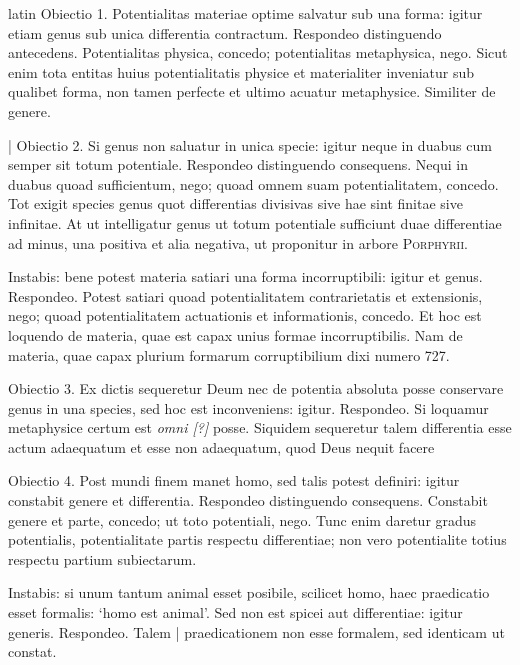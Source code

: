 \begin{otherlanguage*}{latin}
\pstart
 Obiectio 1. Potentialitas materiae optime salvatur sub una forma: igitur etiam genus sub unica differentia contractum. Respondeo distinguendo antecedens. Potentialitas physica, concedo; potentialitas metaphysica, nego. Sicut enim tota entitas huius potentialitatis physice et materialiter inveniatur sub qualibet forma, non tamen perfecte et ultimo acuatur metaphysice. Similiter de genere. 
\pend

\pstart
 \textnormal{|} Obiectio 2. Si genus non saluatur in unica specie: igitur neque in duabus cum semper sit totum potentiale. Respondeo distinguendo consequens. Nequi in duabus quoad sufficientum, nego; quoad omnem suam potentialitatem, concedo. Tot exigit species genus quot differentias divisivas sive hae sint finitae sive infinitae. At ut intelligatur genus ut totum potentiale sufficiunt duae differentiae ad minus, una positiva et alia negativa, ut proponitur in arbore \textsc{Porphyrii}. 
\pend

\pstart
 Instabis: bene potest materia satiari una forma incorruptibili: igitur et genus. Respondeo. Potest satiari quoad potentialitatem contrarietatis et extensionis, nego; quoad potentialitatem actuationis et informationis, concedo. Et hoc est loquendo de materia, quae est capax unius formae incorruptibilis. Nam de materia, quae capax plurium formarum corruptibilium dixi numero 727. 
\pend

\pstart
 Obiectio 3. Ex dictis sequeretur Deum nec de potentia absoluta posse conservare genus in una species, sed hoc est inconveniens: igitur. Respondeo. Si loquamur metaphysice certum est \emph{omni [?]} posse. Siquidem sequeretur talem differentia esse actum adaequatum et esse non adaequatum, quod Deus nequit facere 
\pend

\pstart
 Obiectio 4. Post mundi finem manet homo, sed talis potest definiri: igitur constabit genere et differentia. Respondeo distinguendo consequens. Constabit genere et parte, concedo; ut toto potentiali, nego. Tunc enim daretur gradus potentialis, potentialitate partis respectu differentiae; non vero potentialite totius respectu partium subiectarum. 
\pend

\pstart
 Instabis: si unum tantum animal esset posibile, scilicet homo, haec praedicatio esset formalis: `homo est animal'. Sed non est spicei aut differentiae: igitur generis. Respondeo. Talem \textnormal{|}   praedicationem non esse formalem, sed identicam ut constat. 
\pend


\end{otherlanguage*}
